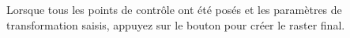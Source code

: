 \label{georeferencer_running}

Lorsque tous les points de contrôle ont été posés et les paramètres de transformation saisis, appuyez sur le bouton  pour créer le raster final. %

\FloatBarrier
